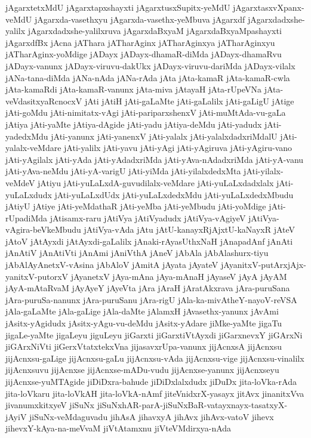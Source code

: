 {jAgarxtetxMdU
jAgarxtapxshayxti
jAgarxtusxSupitx-yeMdU
jAgarxtasxvXpanx-veMdU
jAgarxda-vasethxyu
jAgarxda-vasethx-yeMbuva
jAgarxdf
jAgarxdadxshe-yalilx
jAgarxdadxshe-yalilxruva
jAgarxdaBxyaM
jAgarxdaBxyaMpashayxti
jAgarxdfBx
jAcna
jAThara
jATharAginx
jATharAginxya
jATharAginxyu
jATharAginx-yoMdige
jADayx
jADayx-dhamaR-diMda
jADayx-dhamaRvu
jADayx-vanunx
jADayx-viruvu-dakUkx
jADayx-viruvu-dariMda
jADayx-vilalx
jANa-tana-diMda
jANa-nAda
jANa-rAda
jAta
jAta-kamaR
jAta-kamaR-cwla
jAta-kamaRdi
jAta-kamaR-vanunx
jAta-miva
jAtayaH
jAta-rUpeVNa
jAta-veVdasitxyaRcnocxV
jAti
jAtiH
jAti-gaLaMte
jAti-gaLalilx
jAti-gaLigU
jAtige
jAti-goMdu
jAti-nimitatx-vAgi
jAti-pariparxshenxV
jAti-muMtAda-vu-gaLa
jAtiya
jAti-yaMte
jAtiya-dAgide
jAti-yadu
jAtiya-deMdu
jAti-yadudx
jAti-yadedxMdu
jAti-yanunx
jAti-yanenxV
jAti-yalalx
jAti-yalalxdadxriMdalU
jAti-yalalx-veMdare
jAti-yalilx
jAti-yavu
jAti-yAgi
jAti-yAgiruva
jAti-yAgiru-vano
jAti-yAgilalx
jAti-yAda
jAti-yAdadxriMda
jAti-yAva-nAdadxriMda
jAti-yA-vanu
jAti-yAva-neMdu
jAti-yA-varigU
jAti-yiMda
jAti-yilalxdedxMta
jAti-yilalx-veMdeV
jAtiyu
jAti-yuLaLxdA-guvudilalx-veMdare
jAti-yuLaLxdadxlalx
jAti-yuLaLxdudx
jAti-yuLaLxdUdx
jAti-yuLaLxdedxMdu
jAti-yuLaLxdedxMbudu
jAtiyU
jAtiye
jAti-yeMdathaR
jAti-yeMba
jAti-yeMbudu
jAti-yoMdige
jAti-rUpadiMda
jAtisamx-raru
jAtiVya
jAtiVyadudx
jAtiVya-vAgiyeV
jAtiVya-vAgira-beVkeMbudu
jAtiVya-vAda
jAtu
jAtU-kanayxRjAjxtU-kaNayxR
jAteV
jAtoV
jAtAyxdi
jAtAyxdi-gaLalilx
jAnaki-rAyasUthxNaH
jAnapadAnf
jAnAti
jAnAtiV
jAnAtiVti
jAnAmi
jAniVthA
jAneV
jAbAla
jAbAlashurx-tiyu
jAbAlAyAnetxV-vAsina
jAbAloV
jAmitA
jAyata
jAyateV
jAyanitxV-putArxjAjx-yanitxV-putorxV
jAyanetxV
jAya-mAna
jAya-mAnaH
jAyaseV
jAyA
jAyAM
jAyA-mAtaRvaM
jAyAyeY
jAyeVta
jAra
jAraH
jAratAkxrava
jAra-puruSana
jAra-puruSa-nanunx
jAra-puruSanu
jAra-rigU
jAla-ka-mivAtheY-nayoV-reVSA
jAla-gaLaMte
jAla-gaLige
jAla-daMte
jAlamxH
jAvasethx-yanunx
jAvAmi
jAsitx-yAgidudx
jAsitx-yAgu-vu-deMdu
jAsitx-yAdare
jiMke-yaMte
jigaTu
jigaLe-yaMte
jigaLeyu
jiguLeyu
jiGarxti
jiGarxtiVtAyxdi
jiGarxnevxY
jiGArxNi
jiGArxNiVti
jiGerxVtatxtekxVna
jijasavxrUpa-vanunx
jijAcnxsA
jijAcnxsu
jijAcnxsu-gaLige
jijAcnxsu-gaLu
jijAcnxsu-vAda
jijAcnxsu-vige
jijAcnxsu-vinalilx
jijAcnxsuvu
jijAcnxse
jijAcnxse-mADu-vudu
jijAcnxse-yanunx
jijAcnxseyu
jijAcnxse-yuMTAgide
jiDiDxra-bahude
jiDiDxlalxdudx
jiDuDx
jita-loVka-rAda
jita-loVkaru
jita-loVkAH
jita-loVkA-nAmf
jiteVnidxrX-yasayx
jitAvx
jinanitxVva
jivanumxkitxyeV
jiSuNx
jiSuNxhAR-parA-jiSuNxBaR-vatayxnayx-tasatxyX-jAyiV
jiSuNx-veMdaguvadu
jihAsA
jihavxyA
jihAvx
jihAvx-vatoV
jihevx
jihevxY-kAya-na-meVvaM
jiVtAtamxnu
jiVteVMdirxya-nAda
}
